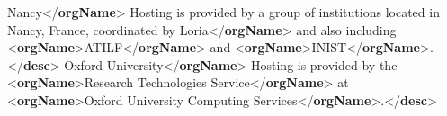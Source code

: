 \begin{shaded}
\hspace*{1em}\mbox{}\newline 
\hspace*{1em}\mbox{}\newline 
\hspace*{1em}\hspace*{1em}Nancy{</\textbf{orgName}>}\mbox{}\newline 
\hspace*{1em}\hspace*{1em}Hosting is provided by a group of institutions located in Nancy, France, coordinated by\mbox{}\newline 
\hspace*{1em}\hspace*{1em}Loria{</\textbf{orgName}>} and also including {<\textbf{orgName}>}ATILF{</\textbf{orgName}>} and {<\textbf{orgName}>}INIST{</\textbf{orgName}>}.{</\textbf{desc}>}\mbox{}\newline 
\hspace*{1em}\mbox{}\newline 
\hspace*{1em}\mbox{}\newline 
\hspace*{1em}\hspace*{1em}Oxford University{</\textbf{orgName}>}\mbox{}\newline 
\hspace*{1em}\hspace*{1em}Hosting is provided by the {<\textbf{orgName}>}Research Technologies Service{</\textbf{orgName}>} at {<\textbf{orgName}>}Oxford University\mbox{}\newline 
\hspace*{1em}\hspace*{1em}\hspace*{1em}\hspace*{1em}\hspace*{1em}\hspace*{1em}\hspace*{1em}\hspace*{1em} Computing Services{</\textbf{orgName}>}.{</\textbf{desc}>}\mbox{}\newline 

\end{shaded}
